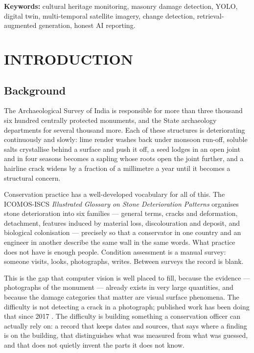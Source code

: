 \documentclass[a4paper,12pt,oneside]{book}
\begin{document}
\vspace{0.4cm}
\noindent
\textbf{Keywords:} cultural heritage monitoring, masonry damage detection, YOLO, digital twin, multi-temporal satellite imagery, change detection, retrieval-augmented generation, honest AI reporting.

\mainmatter
\onehalfspacing
{}

\chapter{INTRODUCTION}

\section{Background}
The Archaeological Survey of India \cite{asi} is responsible for more than three thousand six hundred centrally protected monuments, and the State archaeology departments for several thousand more. Each of these structures is deteriorating continuously and slowly: lime render washes back under monsoon run-off, soluble salts crystallise behind a surface and push it off, a seed lodges in an open joint and in four seasons becomes a sapling whose roots open the joint further, and a hairline crack widens by a fraction of a millimetre a year until it becomes a structural concern.

Conservation practice has a well-developed vocabulary for all of this. The ICOMOS-ISCS \textit{Illustrated Glossary on Stone Deterioration Patterns} \cite{icomos2008glossary} organises stone deterioration into six families --- general terms, cracks and deformation, detachment, features induced by material loss, discolouration and deposit, and biological colonisation --- precisely so that a conservator in one country and an engineer in another describe the same wall in the same words. What practice does not have is enough people. Condition assessment is a manual survey: someone visits, looks, photographs, writes. Between surveys the record is blank.

This is the gap that computer vision is well placed to fill, because the evidence --- photographs of the monument --- already exists in very large quantities, and because the damage categories that matter are visual surface phenomena. The difficulty is not detecting a crack in a photograph; published work has been doing that since 2017 \cite{cha2017deep}. The difficulty is building something a conservation officer can actually rely on: a record that keeps dates and sources, that says where a finding is on the building, that distinguishes what was measured from what was guessed, and that does not quietly invent the parts it does not know.
\end{document}
